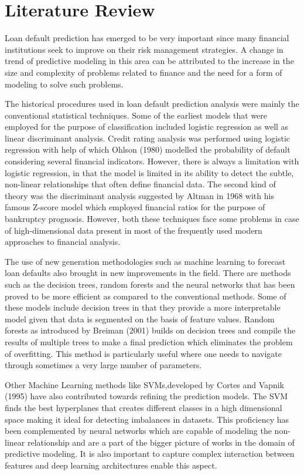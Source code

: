 \documentclass[12pt, a4paper,oneside]{book}
\numberwithin{equation}{section}
\begin{document}
\newpage
\chapter{Literature Review}
Loan default prediction has emerged to be very important since many financial institutions seek to improve on their risk management strategies. A change in trend of predictive modeling in this area can be attributed to the increase in the size and complexity of problems related to finance and the need for a form of modeling to solve such problems. 

The historical procedures used in loan default prediction analysis were mainly the conventional statistical techniques. Some of the earliest models that were employed for the purpose of classification included logistic regression as well as linear discriminant analysis. Credit rating analysis was performed using logistic regression with help of which Ohlson (1980) \cite{ohlson1980financial} modelled the probability of default considering several financial indicators. However, there is always a limitation with logistic regression, in that the model is limited in its ability to detect the subtle, non-linear relationships that often define financial data. The second kind of theory was the discriminant analysis suggested by Altman in 1968 \cite{altman1968financial} with his famous Z-score model which employed financial ratios for the purpose of bankruptcy prognosis. However, both these techniques face some problems in case of high-dimensional data present in most of the frequently used modern approaches to financial analysis. 

The use of new generation methodologies such as machine learning to forecast loan defaults also brought in new improvements in the field. There are methods such as the decision trees, random forests and the neural networks that has been proved to be more efficient as compared to the conventional methods. Some of these models include decision trees in that they provide a more interpretable model given that data is segmented on the basis of feature values. Random forests as introduced by Breiman (2001) \cite{breiman2001random} builds on decision trees and compile the results of multiple trees to make a final prediction which eliminates the problem of overfitting. This method is particularly useful where one needs to navigate through sometimes a very large number of parameters.

Other Machine Learning methods like SVMs,developed by Cortes and Vapnik (1995) \cite{cortes1995support} have also contributed towards refining the prediction models. The SVM finds the best hyperplanes that creates different classes in a high dimensional space making it ideal for detecting imbalances in datasets. This proficiency has been complemented by neural networks which are capable of modeling the non-linear relationship and are a part of the bigger picture of works in the domain of predictive modeling. It is also important to capture complex interaction between features and deep learning architectures enable this aspect.
\end{document}
